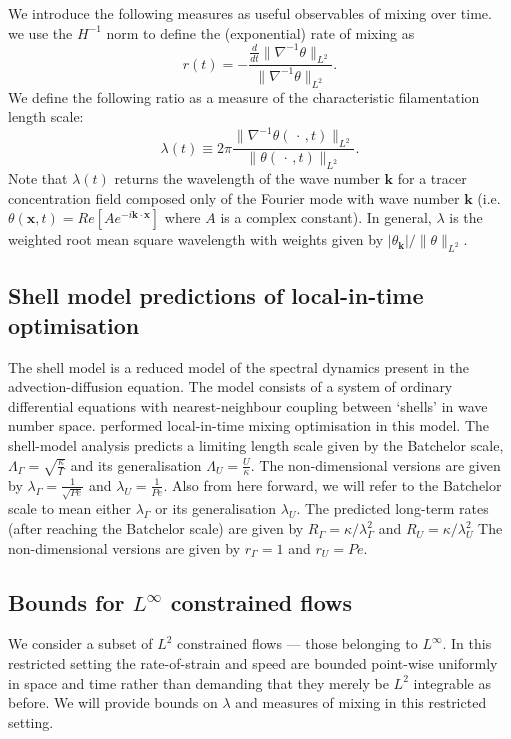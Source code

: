 \documentclass[12pt]{iopart}
\newcommand{\ddt}[1]{\frac{d #1}{dt}}
\newcommand{\hmone}[1]{\|\nabla^{-1} #1\|_{L^{2}}}
\newcommand{\ltwo}[1]{\|#1\|_{L^{2}}}
\renewcommand{\vec}[1]{\mathbf{#1}}
\begin{document}
We introduce the following measures as useful observables of mixing over time. we use the $H^{-1}$ norm to define the (exponential) rate of mixing as
\begin{equation}
\label{eq:rate}
r(t) = -  \frac{\ddt{}\hmone{\theta}}{\hmone{\theta}}.
\end{equation}
We define the following ratio as a measure of the characteristic filamentation length scale:
\begin{equation}
\lambda(t)\equiv  2\pi \frac{\|\nabla^{-1}\theta(\,\cdot\,,t)\|_{L^{2}}}{\|\theta(\,\cdot\,,t)\|_{L^{2}}}.
\end{equation}
Note that $\lambda(t)$ returns the wavelength of the wave number $\vec{k}$ for a tracer concentration field composed only of the Fourier mode with wave number $\vec{k}$ (i.e. $\theta(\vec{x},t) = Re[ A e^{-i\vec{k}\cdot \vec{x}}]$ where $A$ is a complex constant). In general, $\lambda$ is the weighted root mean square wavelength with weights given by $|\theta_{\vec{k}}|/\ltwo{\theta}$. 


\subsection{Shell model predictions of local-in-time optimisation}

The shell model is a reduced model of the spectral dynamics present in the advection-diffusion equation. The model consists of a system of ordinary differential equations with nearest-neighbour coupling between `shells' in wave number space. \cite{Miles2017a} performed local-in-time mixing optimisation in this model. The shell-model analysis predicts a limiting length scale given by the Batchelor scale, $\Lambda_{\Gamma} =\sqrt{\frac{\kappa}{\Gamma}}$  and its generalisation $\Lambda_{U}= \frac{U}{\kappa} $. The non-dimensional versions are given by $\lambda_{\Gamma}= \frac{1}{\sqrt{Pe}}$ and $\lambda_{U} = \frac{1}{Pe}$.  Also from here forward, we will refer to the Batchelor scale to mean either $\lambda_{\Gamma}$ or its generalisation $\lambda_{U}$.  The predicted long-term rates (after reaching the Batchelor scale) are given by $R_{\Gamma} =\kappa/\lambda_{\Gamma}^2 $  and  $R_{U}=\kappa/\lambda_{U}^2$  The non-dimensional versions are given by $r_{\Gamma} =1$ and $r_{U} = Pe $.

\subsection{Bounds for $L^{\infty}$ constrained flows}
We consider a subset of $L^{2}$ constrained flows --- those belonging to $L^{\infty}$. In this restricted setting the rate-of-strain and speed are bounded point-wise uniformly in space and time rather than demanding that they merely be $L^2$ integrable as before. We will provide bounds on $\lambda$ and measures of mixing in this restricted setting. 
\end{document}
